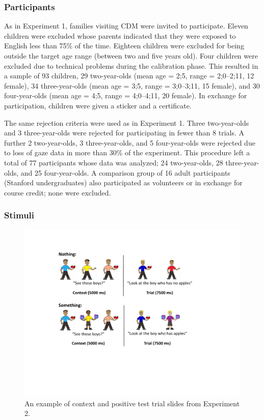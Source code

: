 \documentclass[man]{apa2}
\begin{document}
\subsubsection{Participants}

As in Experiment 1, families visiting CDM were invited to participate.  Eleven children were excluded whose parents indicated that they were exposed to English less than 75\% of the time.  Eighteen children were excluded for being outside the target age range (between two and five years old).  Four children were excluded due to technical problems during the calibration phase.  This resulted in a sample of 93 children, 29 two-year-olds (mean age = 2;5, range = 2;0--2;11, 12 female), 34 three-year-olds (mean age = 3;5, range = 3;0--3;11, 15 female), and 30 four-year-olds (mean age = 4;5, range = 4;0--4;11, 20 female).  In exchange for participation, children were given a sticker and a certificate.  

The same rejection criteria were used as in Experiment 1.  Three two-year-olds and 3 three-year-olds were rejected for participating in fewer than 8 trials.  A further 2 two-year-olds, 3 three-year-olds, and 5 four-year-olds were rejected due to loss of gaze data in more than 30\% of the experiment.  This procedure left a total of 77 participants whose data was analyzed; 24 two-year-olds, 28 three-year-olds, and 25 four-year-olds. A comparison group of 16 adult participants (Stanford undergraduates) also participated as volunteers or in exchange for course credit; none were excluded.

\subsubsection{Stimuli}

\begin{figure}
\begin{center} 
\includegraphics[width=5in]{trialfigure_something.pdf}
\caption{\label{fig:e2stim} An example of context and positive test trial slides from Experiment 2. }
\end{center} 
\end{figure}
\end{document}
